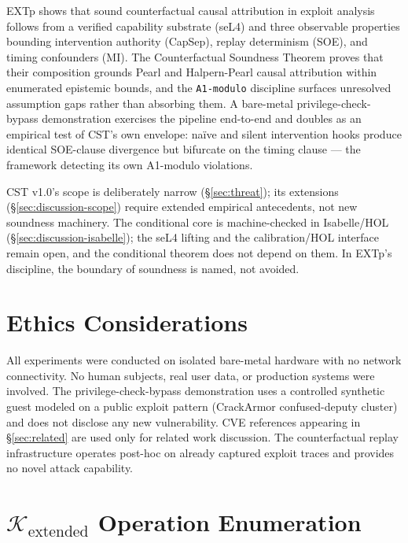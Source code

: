 \documentclass[conference]{IEEEtran}
\newcommand{\Kextended}{\mathcal{K}_\text{extended}}
\begin{document}
EXTp shows that sound counterfactual causal attribution in exploit
analysis follows from a verified capability substrate (seL4) and
three observable properties bounding intervention authority
(CapSep), replay determinism (SOE), and timing confounders (MI).
The Counterfactual Soundness Theorem proves that their composition
grounds Pearl and Halpern-Pearl causal attribution within enumerated
epistemic bounds, and the \texttt{A1-modulo} discipline surfaces
unresolved assumption gaps rather than absorbing them. A bare-metal privilege-check-bypass
demonstration exercises the pipeline end-to-end and doubles as an
empirical test of CST's own envelope: naïve and silent
intervention hooks produce identical SOE-clause divergence but
bifurcate on the timing clause --- the framework detecting its own
A1-modulo violations.

CST v1.0's scope is deliberately narrow (\S\ref{sec:threat}); its
extensions (\S\ref{sec:discussion-scope}) require extended empirical
antecedents, not new soundness machinery. The conditional core is
machine-checked in Isabelle/HOL (\S\ref{sec:discussion-isabelle});
the seL4 lifting and the calibration/HOL interface remain open, and
the conditional theorem does not depend on them. In EXTp's
discipline, the boundary of soundness is named, not avoided.

\section*{Ethics Considerations}

All experiments were conducted on isolated bare-metal hardware with
no network connectivity. No human subjects, real user data, or
production systems were involved. The privilege-check-bypass
demonstration uses a controlled synthetic guest modeled on a public
exploit pattern (CrackArmor confused-deputy cluster) and does not
disclose any new vulnerability. CVE references appearing in
\S\ref{sec:related} are used only for related work discussion. The
counterfactual replay infrastructure operates post-hoc on already
captured exploit traces and provides no novel attack capability.




\appendices

\section{\texorpdfstring{$\Kextended$}{K-extended} Operation Enumeration}\label{app:kextended}
\end{document}
